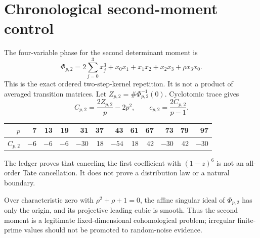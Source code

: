 \section{Chronological second-moment control}

The four-variable phase for the second determinant moment is
\[
 \Phi_{p,2}
 =2\sum_{j=0}^3x_j^3+x_0x_1+x_1x_2+x_2x_3+\rho x_3x_0.
\]
This is the exact ordered two-step-kernel repetition.  It is not a product of
averaged transition matrices.  Let $Z_{p,2}=\#\Phi_{p,2}^{-1}(0)$.  Cyclotomic
trace gives
\[
 C_{p,2}=\frac{2Z_{p,2}}p-2p^2,
 \qquad c_{p,2}=\frac{2C_{p,2}}{p-1}.
\]

\begin{center}
\begin{tabular}{r|rrrrrrrrrrr}
\toprule
$p$&7&13&19&31&37&43&61&67&73&79&97\\
\midrule
$C_{p,2}$&$-6$&$-6$&$-6$&$-30$&18&$-54$&18&42&$-30$&42&$-30$\\
\bottomrule
\end{tabular}
\end{center}

The ledger proves that canceling the first coefficient with $(1-z)^6$ is not
an all-order Tate cancellation.  It does not prove a distribution law or a
natural boundary.

Over characteristic zero with $\rho^2+\rho+1=0$, the affine singular ideal of
$\Phi_{p,2}$ has only the origin, and its projective leading cubic is smooth.
Thus the second moment is a legitimate fixed-dimensional cohomological
problem; irregular finite-prime values should not be promoted to random-noise
evidence.

